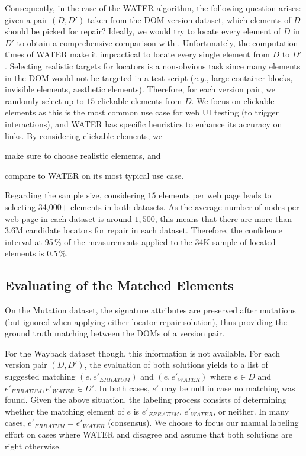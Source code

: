 Consequently, in the case of the WATER algorithm, the following question arises: given a pair $(D, D')$ taken from the DOM version dataset, which elements of $D$ should be picked for repair? 
Ideally, we would try to locate every element of $D$ in $D'$ to obtain a comprehensive comparison with \erratum.
Unfortunately, the computation times of WATER make it impractical to locate every single element from $D$ to $D'$.
Selecting realistic targets for locators is a non-obvious task since many elements in the DOM would not be targeted in a test script (\emph{e.g.}, large container blocks, invisible elements, aesthetic elements).
Therefore, for each version pair, we randomly select up to $15$ clickable elements from $D$.
We focus on clickable elements as this is the most common use case for web UI testing (to trigger interactions), and WATER has specific heuristics to enhance its accuracy on links.
By considering clickable elements, we
\begin{inparaenum}
    \item make sure to choose realistic elements, and
    \item compare to WATER on its most typical use case.
\end{inparaenum}

Regarding the sample size, considering $15$ elements per web page leads to selecting 34,000+ elements in both datasets.
As the average number of nodes per web page in each dataset is around $1,500$, this means that there are more than 3.6M candidate locators for repair in each dataset.
Therefore, the confidence interval at 95\,\% of the measurements applied to the 34K sample of located elements is 0.5\,\%. 

\subsection{Evaluating of the Matched Elements}\label{erratum:sec:manualLabeling}
On the {\sc Mutation} dataset, the signature attributes are preserved after mutations (but ignored when applying either locator repair solution), thus providing the ground truth matching between the DOMs of a version pair.

For the {\sc Wayback} dataset though, this information is not available.
For each version pair $(D, D')$, the evaluation of both solutions yields to a list of suggested matching $(e, e'_{ERRATUM})$ and $(e, e'_{WATER})$ where $e \in D$ and $e'_{ERRATUM}, e'_{WATER} \in D'$.
In both cases, $e'$ may be null in case no matching was found.
Given the above situation, the labeling process consists of determining whether the matching element of $e$ is $e'_{ERRATUM}$, $e'_{WATER}$, or neither.
In many cases, $e'_{ERRATUM} = e'_{WATER}$ (consensus).
We choose to focus our manual labeling effort on cases where WATER and \erratum{} disagree and assume that both solutions are right otherwise.

